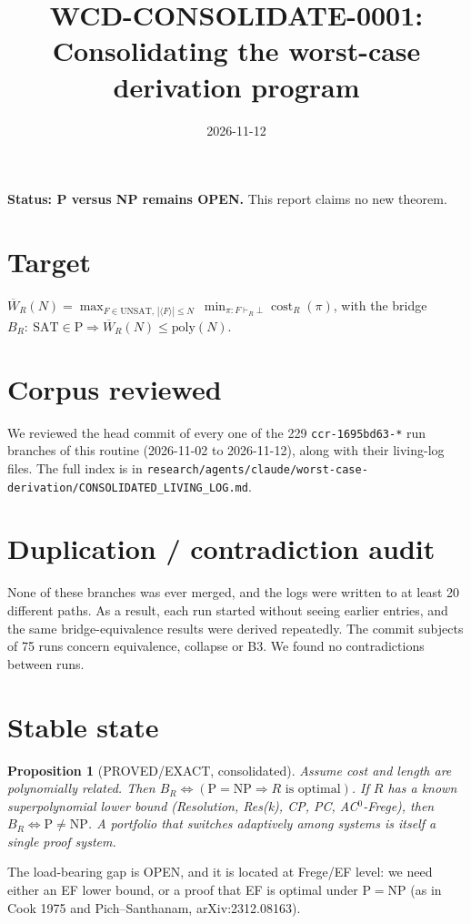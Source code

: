\documentclass[11pt]{article}
\title{WCD-CONSOLIDATE-0001: Consolidating the worst-case derivation program}
\date{2026-11-12}
\newtheorem{proposition}{Proposition}
\begin{document}
\maketitle
\noindent\textbf{Status: P versus NP remains OPEN.} This report claims no new theorem.

\section*{Target}
$\overline W_R(N)=\max_{F\in\mathrm{UNSAT},\,|\langle F\rangle|\le N}\ \min_{\pi:F\vdash_R\bot}\operatorname{cost}_R(\pi)$, with the bridge
$B_R:\ \mathrm{SAT}\in\mathrm P\Rightarrow \overline W_R(N)\le\mathrm{poly}(N)$.

\section*{Corpus reviewed}
We reviewed the head commit of every one of the 229 \texttt{ccr-1695bd63-*} run branches of
this routine (2026-11-02 to 2026-11-12), along with their living-log files. The full index is in
\texttt{research/agents/claude/worst-case-derivation/CONSOLIDATED\_LIVING\_LOG.md}.

\section*{Duplication / contradiction audit}
None of these branches was ever merged, and the logs were written to at least 20 different paths.
As a result, each run started without seeing earlier entries, and the same bridge-equivalence
results were derived repeatedly. The commit subjects of 75 runs concern equivalence, collapse
or B3. We found no contradictions between runs.

\section*{Stable state}
\begin{proposition}[PROVED/EXACT, consolidated]
Assume cost and length are polynomially related. Then
$B_R\iff(\mathrm P=\mathrm{NP}\Rightarrow R\text{ is optimal})$.
If $R$ has a known superpolynomial lower bound (Resolution, Res(k), CP, PC, AC$^0$-Frege), then
$B_R\iff \mathrm P\ne\mathrm{NP}$.
A portfolio that switches adaptively among systems is itself a single proof system.
\end{proposition}
\noindent The load-bearing gap is OPEN, and it is located at Frege/EF level: we need either an EF
lower bound, or a proof that EF is optimal under $\mathrm P=\mathrm{NP}$ (as in Cook 1975 and
Pich--Santhanam, arXiv:2312.08163).
\end{document}

